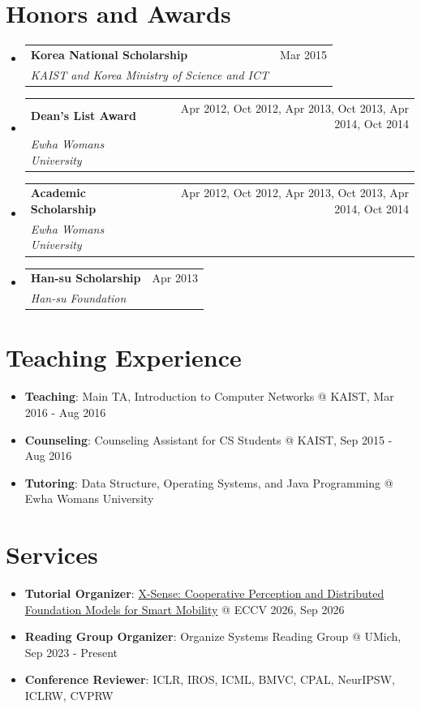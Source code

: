 \documentclass[letterpaper,oneside,11pt]{article}
\makeatletter
\newcommand{\resumeItem}[2]{
  \item\small{
    \textbf{#1}{: #2 \vspace{-2pt}}
  }
}
\newcommand{\resumeSubheading}[4]{
  \vspace{-2pt}\item
    \begin{tabularx}{0.97\textwidth}[t]{X@{\hspace{-5pt}}r}
      \textbf{#1} & #2 \\
      \textit{\small#3} & \small #4 \\
    \end{tabularx}\vspace{-6pt}
}
\newcommand{\awardsSubheading}[4]{
  \resumeSubheading{#1}{#2}{#3}{#4}\vspace{0pt}
}
\newcommand{\resumeSubHeadingListStart}{\begin{itemize}[leftmargin=*]}
\newcommand{\resumeSubHeadingListEnd}{\end{itemize}}
\makeatother
\begin{document}
\section{Honors and Awards}
  \resumeSubHeadingListStart
    \awardsSubheading{Korea National Scholarship}{Mar 2015}
    {KAIST and Korea Ministry of Science and ICT}{}
    \awardsSubheading{Dean's List Award}{Apr 2012, Oct 2012, Apr 2013, Oct 2013, Apr 2014, Oct 2014}
    {Ewha Womans University}{}
    \awardsSubheading{Academic Scholarship}{Apr 2012, Oct 2012, Apr 2013, Oct 2013, Apr 2014, Oct 2014}
    {Ewha Womans University}{}
    \awardsSubheading{Han-su Scholarship}{Apr 2013}
    {Han-su Foundation}{}
  \resumeSubHeadingListEnd

%

\section{Teaching Experience}
\resumeSubHeadingListStart
  \resumeItem{Teaching}{Main TA, Introduction to Computer Networks @ KAIST, Mar 2016 - Aug 2016}
  \resumeItem{Counseling}{Counseling Assistant for CS Students @ KAIST, Sep 2015 - Aug 2016}
  \resumeItem{Tutoring}{Data Structure, Operating Systems, and Java Programming @ Ewha Womans University}
\resumeSubHeadingListEnd


\section{Services}
\resumeSubHeadingListStart
  \resumeItem{Tutorial Organizer}{\href{https://x-sense-tutorial.github.io/x-sense-tutorial/}{X-Sense: Cooperative Perception and Distributed Foundation Models for Smart Mobility} @ ECCV 2026, Sep 2026}
  \resumeItem{Reading Group Organizer}{Organize Systems Reading Group @ UMich, Sep 2023 - Present}
  \resumeItem{Conference Reviewer}{ICLR, IROS, ICML, BMVC, CPAL, NeurIPSW, ICLRW, CVPRW}
\resumeSubHeadingListEnd
\end{document}
